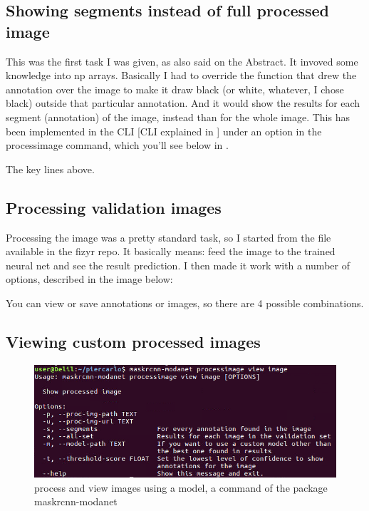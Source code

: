 \subsection{Showing segments instead of full processed image}

This was the first task I was given, as also said on the Abstract. It invoved some knowledge into np arrays. Basically I had to override the function that drew the annotation over the image to make it draw black (or white, whatever, I chose black) outside that particular annotation.
And it would show the results for each segment (annotation) of the image, instead than for the whole image. This has been implemented in the CLI [CLI explained in ] under an option in the processimage command, which you'll see below in .



The key lines above.

\subsection{Processing validation  images}\label{s:processimage}

Processing the image was a pretty standard task, so I started from the file available in the fizyr repo. It basically means: feed the image to the trained neural net and see the result prediction.
I then made it work with a number of options, described in the image below:



You can view or save annotations or images, so there are 4 possible combinations.

\subsection{Viewing custom processed images}

\begin{figure}[H]
	\centering
	\includegraphics[width=\linewidth]{figures/cli/processimageviewimage}
	\caption{process and view images using a model, a command of the package maskrcnn-modanet}
	\label{f:cli-processimageviewimage}
\end{figure}

